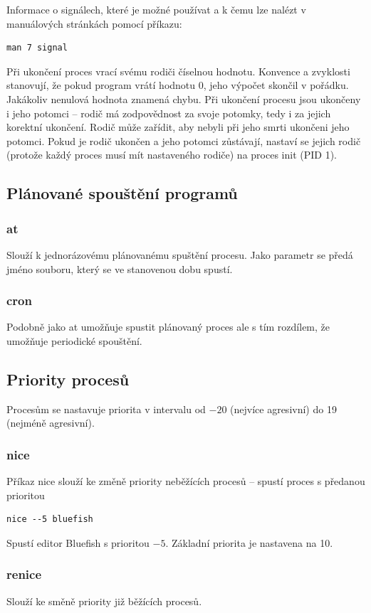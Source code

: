 \documentclass{article}
\begin{document}
Informace o signálech, které je možné používat a k čemu lze nalézt v manuálových stránkách pomocí příkazu:
\begin{verbatim}
man 7 signal
\end{verbatim}

Při ukončení proces vrací svému rodiči číselnou hodnotu. Konvence a zvyklosti stanovují, že pokud program vrátí hodnotu 0, jeho výpočet skončil v pořádku. Jakákoliv nenulová hodnota znamená chybu. Při ukončení procesu jsou ukončeny i jeho potomci -- rodič má zodpovědnost za svoje potomky, tedy i za jejich korektní ukončení. Rodič může zařídit, aby nebyli při jeho smrti ukončeni jeho potomci. Pokud je rodič ukončen a jeho potomci zůstávají, nastaví se jejich rodič (protože každý proces musí mít nastaveného rodiče) na proces init (PID 1).

\subsection{Plánované spouštění programů}
\subsubsection{at}
Slouží k jednorázovému plánovanému spuštění procesu. Jako parametr se předá jméno souboru, který se ve stanovenou dobu spustí. 

\subsubsection{cron}
Podobně jako at umožňuje spustit plánovaný proces ale s tím rozdílem, že umožňuje periodické spouštění. 

\subsection{Priority procesů}
Procesům se nastavuje priorita v intervalu od $-20$ (nejvíce agresivní) do 19 (nejméně agresivní).
\subsubsection{nice}
Příkaz nice slouží ke změně priority neběžících procesů -- spustí proces s předanou prioritou
\begin{verbatim}
nice --5 bluefish
\end{verbatim}
Spustí editor Bluefish s prioritou $-5$. Základní priorita je nastavena na 10.

\subsubsection{renice}
Slouží ke směně priority již běžících procesů.
\end{document}
